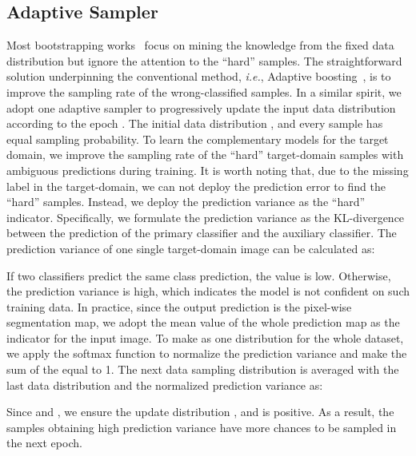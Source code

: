 \documentclass[journal]{IEEEtran}
\def\ie{\emph{i.e.}}
\begin{document}
\subsection{Adaptive Sampler} \label{sec:sampler}
Most bootstrapping works~\cite{reed2014training,laine2016temporal} focus on mining the knowledge from the fixed data distribution but ignore the attention to the ``hard'' samples. The straightforward solution underpinning the conventional method, \ie, Adaptive boosting~\cite{freund1996experiments}, is to improve the sampling rate of the wrong-classified samples. 
In a similar spirit, we adopt one adaptive sampler to progressively update the input data distribution  according to the epoch . The initial data distribution , and every sample has equal sampling probability. To learn the complementary models for the target domain, we improve the sampling rate of the ``hard'' target-domain samples with ambiguous predictions during training. It is worth noting that, due to the missing label in the target-domain, 
we can not deploy the prediction error to find the ``hard'' samples. Instead, we deploy the prediction variance as the ``hard'' indicator. Specifically, we formulate the prediction variance as the KL-divergence between the prediction of the primary classifier and the auxiliary classifier. The prediction variance of one single target-domain image can be calculated as:

If two classifiers predict the same class prediction, the value  is low. Otherwise, the prediction variance is high, which indicates the model is not confident on such training data. In practice, since the output prediction is the pixel-wise segmentation map, we adopt the mean value of the whole prediction map as the indicator for the input image. 
To make  as one distribution for the whole dataset, we apply the softmax function to normalize the prediction variance and make the sum of the  equal to 1. The next data sampling distribution is averaged with the last data distribution and the normalized prediction variance as: 

Since  and , we ensure the update distribution , and  is positive.
As a result, the samples obtaining high prediction variance have more chances to be sampled in the next epoch. 
\end{document}
